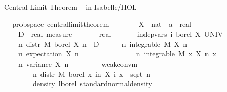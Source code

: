 \documentclass[usepdftitle=false]{beamer}
\begin{document}
\begin{frame}{Central Limit Theorem -- in Isabelle/HOL} %

\begin{isabellebody}
\isamarkupfalse%
\ {\isacharparenleft}\,\ prob{\isacharunderscore}space{\isacharparenright}\ central{\isacharunderscore}limit{\isacharunderscore}theorem{\isacharcolon}\isanewline
\ \ \ \isanewline
\ \ \ \ X\ {\isacharcolon}{\isacharcolon}\ {\isachardoublequoteopen}nat\ {\isasymRightarrow}\ {\isacharprime}a\ {\isasymRightarrow}\ real{\isachardoublequoteclose}\ \isanewline
\ \ \ \ D\ {\isacharcolon}{\isacharcolon}\ {\isachardoublequoteopen}real\ measure{\isachardoublequoteclose}\ \isanewline
\ \ \ \ {\isasymsigma}\ {\isacharcolon}{\isacharcolon}\ real\isanewline
\pause
\ \ \isanewline
\ \ \ \ {\isachardoublequoteopen}indep{\isacharunderscore}vars\ {\isacharparenleft}{\isasymlambda}i{\isachardot}\ borel{\isacharparenright}\ X\ UNIV{\isachardoublequoteclose}\ \isanewline
\ \ \ \ {\isachardoublequoteopen}{\isasymAnd}n{\isachardot}\ distr\ M\ borel\ {\isacharparenleft}X\ n{\isacharparenright}\ {\isacharequal}\ D{\isachardoublequoteclose}
\pause\ \isanewline
\ \ \ \ {\isachardoublequoteopen}{\isasymAnd}n{\isachardot}\ integrable\ M\ {\isacharparenleft}X\ n{\isacharparenright}{\isachardoublequoteclose}\ \isanewline
\ \ \ \ {\isachardoublequoteopen}{\isasymAnd}n{\isachardot}\ expectation\ {\isacharparenleft}X\ n{\isacharparenright}\ {\isacharequal}\ {}{\isachardoublequoteclose}
\pause\ \isanewline
\ \ \ \ {\isachardoublequoteopen}{\isasymsigma}\ {\isachargreater}\ {}{\isachardoublequoteclose}\ \isanewline
\ \ \ \ {\isachardoublequoteopen}{\isasymAnd}n{\isachardot}\ integrable\ M\ {\isacharparenleft}{\isasymlambda}x{\isachardot}\ {\isacharparenleft}X\ n\ x{\isacharparenright}\ \isanewline
\ \ \ \ {\isachardoublequoteopen}{\isasymAnd}n{\isachardot}\ variance\ {\isacharparenleft}X\ n{\isacharparenright}\ {\isacharequal}\ {\isasymsigma}\isanewline
\ \ \isanewline
\ \ \ \ {\isachardoublequoteopen}weak{\isacharunderscore}conv{\isacharunderscore}m\ \isanewline
\ \ \ \ \ \ \ \ {\isacharparenleft}{\isasymlambda}n{\isachardot}\ distr\ M\ borel\ {\isacharparenleft}{\isasymlambda}x{\isachardot}\ {\isasymSum}i{\isacharless}n{\isachardot}\ X\ i\ x\ {\isacharslash}\ sqrt\ {\isacharparenleft}n\ {\isacharasterisk}\ {\isasymsigma}\isanewline
\ \ \ \ \ \ \ \ {\isacharparenleft}density\ lborel\ standard{\isacharunderscore}normal{\isacharunderscore}density{\isacharparenright}{\isachardoublequoteclose}
\end{isabellebody}

\end{frame} %
\end{document}
